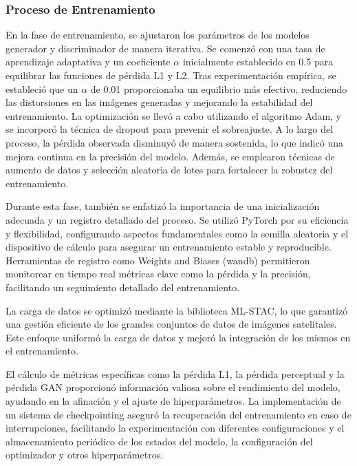             \subsubsection{Proceso de Entrenamiento}
                En la fase de entrenamiento, se ajustaron los parámetros de los modelos generador y discriminador de manera iterativa. Se comenzó con una tasa de aprendizaje adaptativa y un coeficiente \( \alpha \) inicialmente establecido en 0.5 para equilibrar las funciones de pérdida L1 y L2. Tras experimentación empírica, se estableció que un \( \alpha \) de 0.01 proporcionaba un equilibrio más efectivo, reduciendo las distorsiones en las imágenes generadas y mejorando la estabilidad del entrenamiento. La optimización se llevó a cabo utilizando el algoritmo Adam, y se incorporó la técnica de dropout para prevenir el sobreajuste. A lo largo del proceso, la pérdida observada disminuyó de manera sostenida, lo que indicó una mejora continua en la precisión del modelo. Además, se emplearon técnicas de aumento de datos y selección aleatoria de lotes para fortalecer la robustez del entrenamiento.

                Durante esta fase, también se enfatizó la importancia de una inicialización adecuada y un registro detallado del proceso. Se utilizó PyTorch por su eficiencia y flexibilidad, configurando aspectos fundamentales como la semilla aleatoria y el dispositivo de cálculo para asegurar un entrenamiento estable y reproducible. Herramientas de registro como Weights and Biases (wandb) permitieron monitorear en tiempo real métricas clave como la pérdida y la precisión, facilitando un seguimiento detallado del entrenamiento.

                La carga de datos se optimizó mediante la biblioteca ML-STAC, lo que garantizó una gestión eficiente de los grandes conjuntos de datos de imágenes satelitales. Este enfoque uniformó la carga de datos y mejoró la integración de los mismos en el entrenamiento.

                El cálculo de métricas específicas como la pérdida L1, la pérdida perceptual y la pérdida GAN proporcionó información valiosa sobre el rendimiento del modelo, ayudando en la afinación y el ajuste de hiperparámetros. La implementación de un sistema de checkpointing aseguró la recuperación del entrenamiento en caso de interrupciones, facilitando la experimentación con diferentes configuraciones y el almacenamiento periódico de los estados del modelo, la configuración del optimizador y otros hiperparámetros.

